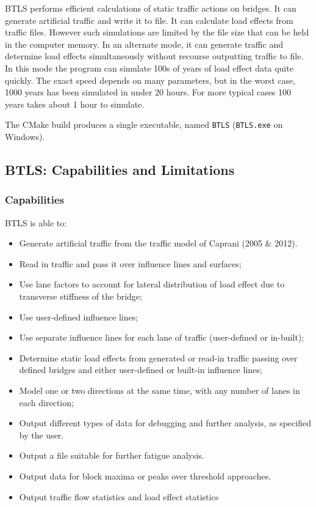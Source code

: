 \documentclass[
]{article}
\begin{document}
BTLS performs efficient calculations of static traffic actions on
bridges. It can generate artificial traffic and write it to file. It can
calculate load effects from traffic files. However such simulations are
limited by the file size that can be held in the computer memory. In an
alternate mode, it can generate traffic and determine load effects
simultaneously without recourse outputting traffic to file. In this mode
the program can simulate 100s of years of load effect data quite
quickly. The exact speed depends on many parameters, but in the worst
case, 1000 years has been simulated in under 20 hours. For more typical
cases 100 years takes about 1 hour to simulate.

The CMake build produces a single executable, named \texttt{BTLS}
(\texttt{BTLS.exe} on Windows).

\subsection{BTLS: Capabilities and
Limitations}\label{btls-capabilities-and-limitations}

\subsubsection*{Capabilities}\label{capabilities}

BTLS is able to:

\begin{itemize}
\item
  Generate artificial traffic from the traffic model of Caprani (2005 \&
  2012).
\item
  Read in traffic and pass it over influence lines and surfaces;
\item
  Use lane factors to account for lateral distribution of load effect
  due to transverse stiffness of the bridge;
\item
  Use user-defined influence lines;
\item
  Use separate influence lines for each lane of traffic (user-defined or
  in-built);
\item
  Determine static load effects from generated or read-in traffic
  passing over defined bridges and either user-defined or built-in
  influence lines;
\item
  Model one or two directions at the same time, with any number of lanes
  in each direction;
\item
  Output different types of data for debugging and further analysis, as
  specified by the user.
\item
  Output a file suitable for further fatigue analysis.
\item
  Output data for block maxima or peaks over threshold approaches.
\item
  Output traffic flow statistics and load effect statistics
\end{itemize}
\end{document}
